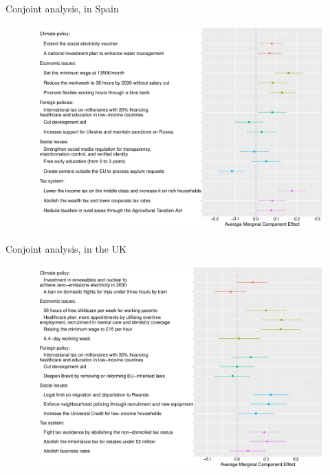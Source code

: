 \documentclass[aspectratio=169,xcolor=dvipsnames, 11pt,mathserif]{beamer}
\begin{document}
\begin{frame}{Conjoint analysis,  in Spain\label{conjoint_countries} \hyperlink{conjoint_country}{}} 
    \begin{figure} \vspace{-.14cm}
\includegraphics[height=.97\textheight]{../figures/all/conjoint_EN-ES.pdf}
\end{figure}
\end{frame}

\begin{frame}{Conjoint analysis,  in the UK\label{conjoint_countries} \hyperlink{conjoint_country}{}} 
    \begin{figure} \vspace{-.14cm}
\includegraphics[height=.97\textheight]{../figures/all/conjoint_EN-GB.pdf}
\end{figure}
\end{frame}
\end{document}
